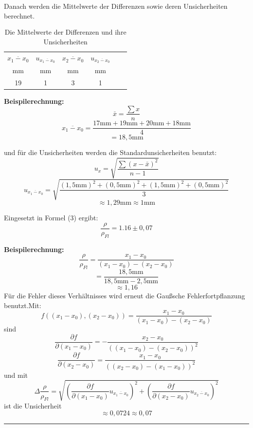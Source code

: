 \documentclass[11pt,a4paper]{article} %
\begin{document}
\vspace{5mm}
Danach werden die Mittelwerte der Differenzen sowie deren Unsicherheiten berechnet. 

\begin{table}[h]
	\begin{tabular*}{0.99\textwidth}{@{\extracolsep{\fill}}cccccc}
		\toprule
		$\overline{x_1-x_0}$ & $u_{\overline{x_1-x_0}}$ &  $\overline{x_2-x_0}$  &  $u_{\overline{x_2-x_0}}$  \\
		mm & mm &  mm & mm   \\
		\midrule
		19 & 1 & 3 & 1 \\
		
		\bottomrule
	\end{tabular*}
	\caption{Die Mittelwerte der Differenzen und ihre Unsicherheiten}
	\label{tabelle2}
\end{table}


\begin{tcolorbox}[colback=white]
	\textbf{Beispilerechnung:}
$$\bar{x}=\frac{\sum x}{n}$$
$$\overline{x_1-x_0}=\frac{17\textrm{mm}+19\textrm{mm}+20\textrm{mm}+18\textrm{mm}}{4}$$
$$=18,5\textrm{mm}$$

und für die Unsicherheiten werden die Standardunsicherheiten benutzt:
\begin{equation}
u_{x}=\sqrt{\frac{\sum(x-\bar{x})^2}{n-1}}
\end{equation}
$$u_{\overline{x_1-x_0}}=\sqrt{\frac{(1,5\textrm{mm})^2+(0,5\textrm{mm})^2+(1,5\textrm{mm})^2+(0,5\textrm{mm})^2}{3}}$$
$$\approx1,29\textrm{mm}\approx1\textrm{mm}$$
\end{tcolorbox}
\vspace{5mm}

Eingesetzt in Formel (3) ergibt:
$$\frac{\rho}{\rho_{Fl}} = 1.16 \pm0,07$$


\begin{tcolorbox}[colback=white]
	\textbf{Beispilerechnung:}
$$\frac{\rho}{\rho_{Fl}} = \frac{x_1-x_0}{(x_1-x_0)-(x_2-x_0)}$$
$$=\frac{18,5\textrm{mm}}{18,5\textrm{mm}-2,5\textrm{mm}}$$
$$\approx1,16$$
Für die Fehler dieses Verhältnisses wird erneut die Gaußsche Fehlerfortpflanzung benutzt.Mit:
$$f((x_1-x_0),(x_2-x_0))=\frac{x_1-x_0}{(x_1-x_0)-(x_2-x_0)}$$
sind
$$\frac{\partial f}{\partial (x_1-x_0)}=-\dfrac{x_2-x_0}{\left((x_1-x_0)-(x_2-x_0)\right)^2}$$
$$\frac{\partial f}{\partial (x_2-x_0)}=\dfrac{x_1-x_0}{\left((x_2-x_0)-(x_1-x_0)\right)^2}$$
und mit
$$\Delta{\frac{\rho}{\rho_{Fl}}}=\sqrt{(\frac{\partial f}{\partial (x_1-x_0)}u_{\overline{x_1-x_0}})^2+(\frac{\partial f}{\partial (x_2-x_0)}u_{\overline{x_2-x_0}})^2}$$
ist die Unsicherheit
$$\approx0,0724\approx0,07$$
\end{tcolorbox}
\hrule
\vspace{5mm}
\end{document}
